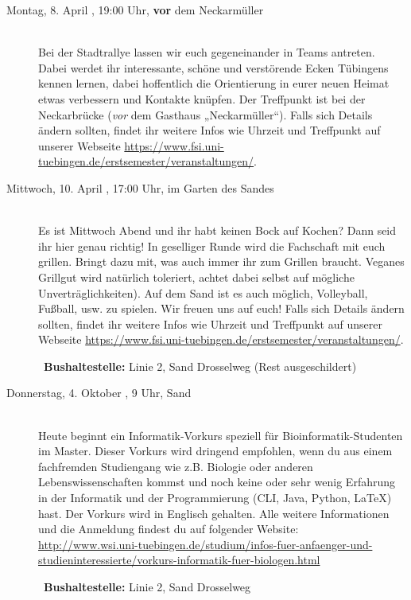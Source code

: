 \begin{description}
\item[Montag, 8. April \YEAR, 19:00 Uhr, \textbf{vor} dem Neckarmüller ]\ \\
Bei der Stadtrallye lassen wir euch gegeneinander in Teams antreten. Dabei werdet ihr interessante, schöne und verstörende Ecken Tübingens kennen lernen, dabei hoffentlich die Orientierung in eurer neuen Heimat etwas verbessern und Kontakte knüpfen. Der Treffpunkt ist bei der Neckarbrücke (\emph{vor} dem Gasthaus „Neckarmüller“).
Falls sich Details ändern sollten, findet ihr weitere Infos wie Uhrzeit und Treffpunkt auf unserer Webseite \url{https://www.fsi.uni-tuebingen.de/erstsemester/veranstaltungen/}.


\item[Mittwoch, 10. April \YEAR, 17:00 Uhr, im Garten des Sandes ]\ \\
Es ist Mittwoch Abend und ihr habt keinen Bock auf Kochen? Dann seid ihr hier genau richtig! In geselliger Runde wird die Fachschaft mit euch grillen. Bringt dazu mit, was auch immer ihr zum Grillen braucht. Veganes Grillgut wird natürlich toleriert, achtet dabei selbst auf mögliche Unverträglichkeiten). Auf dem Sand ist es auch möglich, Volleyball, Fußball, usw. zu spielen. Wir freuen uns auf euch!
Falls sich Details ändern sollten, findet ihr weitere Infos wie Uhrzeit und Treffpunkt auf unserer Webseite \url{https://www.fsi.uni-tuebingen.de/erstsemester/veranstaltungen/}.

~\textbf{Bushaltestelle:} Linie 2, Sand Drosselweg (Rest ausgeschildert)



\ifwintersemester
\ifmaster
\ifbinfo
\item[Donnerstag, 4. Oktober \YEAR, 9 Uhr, Sand]\ \\
 Heute beginnt ein Informatik-Vorkurs speziell für Bioinformatik-Studenten im Master. Dieser Vorkurs wird dringend empfohlen, wenn du aus einem fachfremden Studiengang wie z.B. Biologie oder anderen Lebenswissenschaften kommst und noch keine oder sehr wenig Erfahrung in der Informatik und der Programmierung (CLI, Java, Python, \LaTeX) hast. Der Vorkurs wird in Englisch gehalten. Alle weitere Informationen und die Anmeldung findest du auf folgender Website: \\ \url{http://www.wsi.uni-tuebingen.de/studium/infos-fuer-anfaenger-und-studieninteressierte/vorkurs-informatik-fuer-biologen.html}

~\textbf{Bushaltestelle:} Linie 2, Sand Drosselweg
\fi
\fi
\fi




\end{description}

